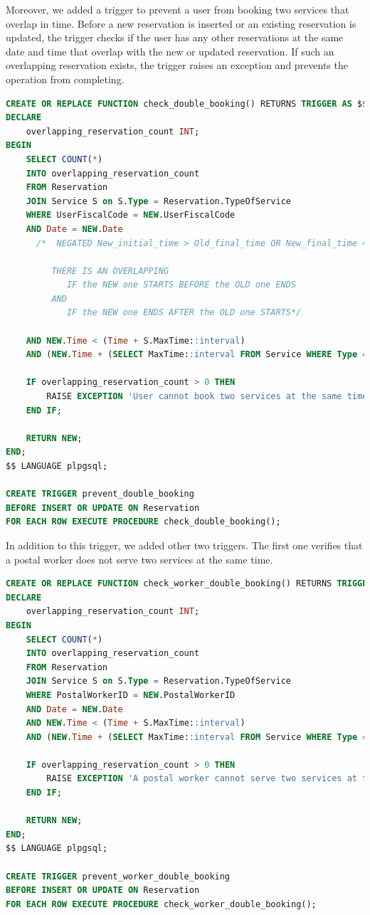 \documentclass{article}
\begin{document}
Moreover, we added a trigger to prevent a user from booking two services that overlap in time. Before a new reservation is inserted or an existing reservation is updated, the trigger checks if the user has any other reservations at the same date and time that overlap with the new or updated reservation. If such an overlapping reservation exists, the trigger raises an exception and prevents the operation from completing.
\begin{lstlisting}[language=SQL]
CREATE OR REPLACE FUNCTION check_double_booking() RETURNS TRIGGER AS $$
DECLARE
    overlapping_reservation_count INT;
BEGIN
    SELECT COUNT(*)
    INTO overlapping_reservation_count
    FROM Reservation
    JOIN Service S on S.Type = Reservation.TypeOfService
    WHERE UserFiscalCode = NEW.UserFiscalCode
    AND Date = NEW.Date
      /*  NEGATED New_initial_time > Old_final_time OR New_final_time < old_initial_time

         THERE IS AN OVERLAPPING
            IF the NEW one STARTS BEFORE the OLD one ENDS
         AND
            IF the NEW one ENDS AFTER the OLD one STARTS*/

    AND NEW.Time < (Time + S.MaxTime::interval)
    AND (NEW.Time + (SELECT MaxTime::interval FROM Service WHERE Type = NEW.TypeOfService)) > Time;

    IF overlapping_reservation_count > 0 THEN
        RAISE EXCEPTION 'User cannot book two services at the same time';
    END IF;

    RETURN NEW;
END;
$$ LANGUAGE plpgsql;

CREATE TRIGGER prevent_double_booking
BEFORE INSERT OR UPDATE ON Reservation
FOR EACH ROW EXECUTE PROCEDURE check_double_booking();

\end{lstlisting}
In addition to this trigger, we added other two triggers. The first one verifies that a postal worker does not serve two services at the same time.
\begin{lstlisting}[language=SQL]
    CREATE OR REPLACE FUNCTION check_worker_double_booking() RETURNS TRIGGER AS $$
DECLARE
    overlapping_reservation_count INT;
BEGIN
    SELECT COUNT(*)
    INTO overlapping_reservation_count
    FROM Reservation
    JOIN Service S on S.Type = Reservation.TypeOfService
    WHERE PostalWorkerID = NEW.PostalWorkerID
    AND Date = NEW.Date
    AND NEW.Time < (Time + S.MaxTime::interval)
    AND (NEW.Time + (SELECT MaxTime::interval FROM Service WHERE Type = NEW.TypeOfService)) > Time;

    IF overlapping_reservation_count > 0 THEN
        RAISE EXCEPTION 'A postal worker cannot serve two services at the same time';
    END IF;

    RETURN NEW;
END;
$$ LANGUAGE plpgsql;

CREATE TRIGGER prevent_worker_double_booking
BEFORE INSERT OR UPDATE ON Reservation
FOR EACH ROW EXECUTE PROCEDURE check_worker_double_booking();
\end{lstlisting}
\end{document}
